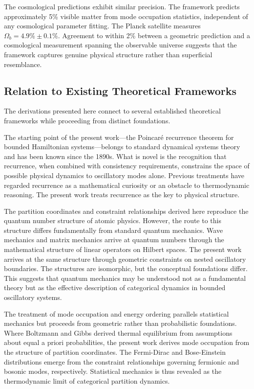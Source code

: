 \documentclass[11pt,a4paper]{article}
\theoremstyle{remark}
\begin{document}
The cosmological predictions exhibit similar precision. The framework predicts approximately 5\% visible matter from mode occupation statistics, independent of any cosmological parameter fitting. The Planck satellite measures $\Omega_b = 4.9\% \pm 0.1\%$. Agreement to within 2\% between a geometric prediction and a cosmological measurement spanning the observable universe suggests that the framework captures genuine physical structure rather than superficial resemblance.

\subsection{Relation to Existing Theoretical Frameworks}

The derivations presented here connect to several established theoretical frameworks while proceeding from distinct foundations.

The starting point of the present work—the Poincar\'{e} recurrence theorem for bounded Hamiltonian systems—belongs to standard dynamical systems theory and has been known since the 1890s. What is novel is the recognition that recurrence, when combined with consistency requirements, constrains the space of possible physical dynamics to oscillatory modes alone. Previous treatments have regarded recurrence as a mathematical curiosity or an obstacle to thermodynamic reasoning. The present work treats recurrence as the key to physical structure.

The partition coordinates and constraint relationships derived here reproduce the quantum number structure of atomic physics. However, the route to this structure differs fundamentally from standard quantum mechanics. Wave mechanics and matrix mechanics arrive at quantum numbers through the mathematical structure of linear operators on Hilbert spaces. The present work arrives at the same structure through geometric constraints on nested oscillatory boundaries. The structures are isomorphic, but the conceptual foundations differ. This suggests that quantum mechanics may be understood not as a fundamental theory but as the effective description of categorical dynamics in bounded oscillatory systems.

The treatment of mode occupation and energy ordering parallels statistical mechanics but proceeds from geometric rather than probabilistic foundations. Where Boltzmann and Gibbs derived thermal equilibrium from assumptions about equal a priori probabilities, the present work derives mode occupation from the structure of partition coordinates. The Fermi-Dirac and Bose-Einstein distributions emerge from the constraint relationships governing fermionic and bosonic modes, respectively. Statistical mechanics is thus revealed as the thermodynamic limit of categorical partition dynamics.
\end{document}
